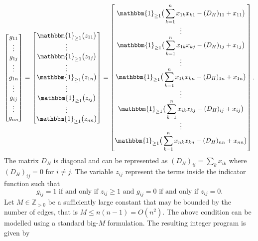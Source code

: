 \documentclass[11pt]{report}
\begin{document}
\begin{equation}  \label{eq::fund_programming_equation}
\begin{bmatrix}
g_{11} \\
\vdots \\
g_{1j} \\
\vdots \\
g_{1n} \\
\vdots \\
g_{ij} \\
\vdots \\
g_{nn}
\end{bmatrix} 
=
\begin{bmatrix}
\mathbbm{1}_{\geq 1}\big(z_{11}\big) \\
\vdots \\
\mathbbm{1}_{\geq 1}\big(z_{1j}\big) \\
\vdots \\
\mathbbm{1}_{\geq 1}\big(z_{1n}\big) \\
\vdots \\
\mathbbm{1}_{\geq 1}\big(z_{ij}\big) \\
\vdots \\
\mathbbm{1}_{\geq 1}\big(z_{nn}\big)
\end{bmatrix}
=
\begin{bmatrix} \displaystyle
\mathbbm{1}_{\geq 1}\big(\sum_{k=1}^n x_{1k}x_{k1} - (D_H)_{11} + x_{11} \big) \\
\vdots \\ \displaystyle
\mathbbm{1}_{\geq 1}\big(\sum_{k=1}^n x_{1k}x_{kj} - (D_H)_{1j} + x_{1j} \big) \\
\vdots \\ \displaystyle
\mathbbm{1}_{\geq 1}\big(\sum_{k=1}^n x_{1k}x_{kn} - (D_H)_{1n} + x_{1n} \big)\\
\vdots \\ \displaystyle
\mathbbm{1}_{\geq 1}\big(\sum_{k=1}^n x_{ik}x_{kj} - (D_H)_{ij} + x_{ij} \big)\\
\vdots \\ \displaystyle
\mathbbm{1}_{\geq 1}\big(\sum_{k=1}^n x_{nk}x_{kn} - (D_H)_{nn} + x_{nn} \big)
\end{bmatrix}.
\end{equation}
The matrix $D_H$ is diagonal and can be represented as $\displaystyle (D_H)_{ii} = \sum_{k} x_{ik}$ where $(D_H)_{ij} = 0$ for $i \neq j$. The variable $z_{ij}$ represent the terms inside the indicator function such that
\[
g_{ij} = 1 \text{ if and only if } z_{ij} \geq 1 \text{ and } g_{ij} = 0 \text{ if and only if } z_{ij} = 0.
\]  
Let $M \in \mathbb{Z}_{> 0}$ be a sufficiently large constant that may be bounded by the number of edges, that is $M \leq n(n -1) = O(n^2)$. The above condition can be modelled using a standard big-$M$ formulation. The resulting integer program is given by
\end{document}
